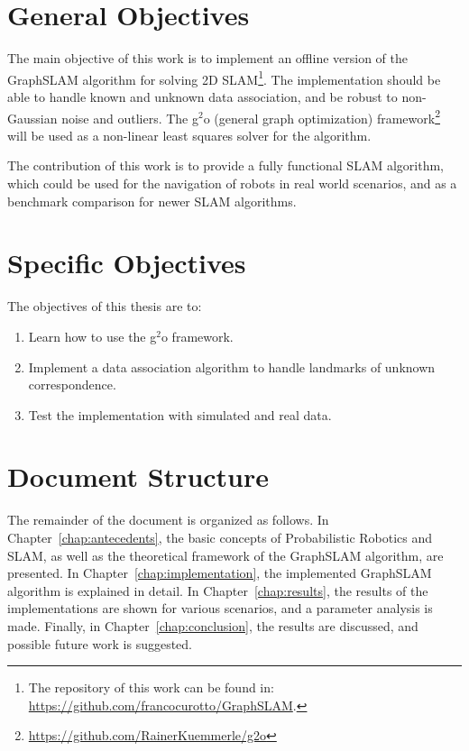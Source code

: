 \section{General Objectives}

The main objective of this work is to implement an offline version of the GraphSLAM algorithm for solving 2D SLAM\footnote{The repository of this work can be found in: \url{https://github.com/francocurotto/GraphSLAM}.}. The implementation should be able to handle known and unknown data association, and be robust to non-Gaussian noise and outliers. The g$^2$o (general graph optimization) framework\footnote{\url{https://github.com/RainerKuemmerle/g2o}} will be used as a non-linear least squares solver for the algorithm.

The contribution of this work is to provide a fully functional SLAM algorithm, which could be used for the navigation of robots in real world scenarios, and as a benchmark comparison for newer SLAM algorithms.

\section{Specific Objectives}

The objectives of this thesis are to:

\begin{enumerate}
    \item Learn how to use the g$^2$o framework.
    \item Implement a data association algorithm to handle landmarks of unknown correspondence.
    \item Test the implementation with simulated and real data. 
\end{enumerate}

\section{Document Structure}

The remainder of the document is organized as follows. In Chapter~\ref{chap:antecedents}, the basic concepts of Probabilistic Robotics and SLAM, as well as the theoretical framework of the GraphSLAM algorithm, are presented. In Chapter~\ref{chap:implementation}, the implemented GraphSLAM algorithm is explained in detail. In Chapter~\ref{chap:results}, the results of the implementations are shown for various scenarios, and a parameter analysis is made. Finally, in Chapter~\ref{chap:conclusion}, the results are discussed, and possible future work is suggested. 
